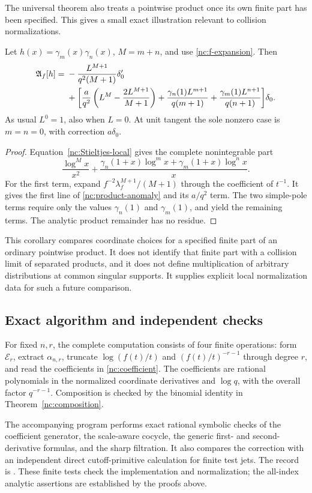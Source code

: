 The universal theorem also treats a pointwise product once its own
finite part has been specified. This gives a small exact illustration
relevant to collision normalizations.

\begin{corollary}
\label{nc:coincident}
Let $h(x)=\gamma_m(x)\gamma_n(x)$, $M=m+n$, and use
\eqref{nc:f-expansion}. Then
\begin{align}\label{nc:product-anomaly}
 \mathfrak A_f[h]={}&-\frac{L^{M+1}}{q^2(M+1)}\delta_0'\notag\\
 &+\biggl[
  \frac{a}{q^2}\left(L^M-\frac{2L^{M+1}}{M+1}\right)
  +\frac{\gamma_n(1)L^{m+1}}{q(m+1)}
  +\frac{\gamma_m(1)L^{n+1}}{q(n+1)}
                  \biggr]\delta_0.
\end{align}
As usual $L^0=1$, also when $L=0$. At unit tangent the sole nonzero
case is $m=n=0$, with correction $a\delta_0$.
\end{corollary}
\begin{proof}
Equation~\eqref{nc:Stieltjes-local} gives the complete nonintegrable
part
\[
 \frac{\log^{M}x}{x^2}
 +\frac{\gamma_n(1+x)\log^m x+
         \gamma_m(1+x)\log^n x}{x}.
\]
For the first term, expand $f^{-2}\lambda_f^{M+1}/(M+1)$ through
the coefficient of $t^{-1}$. It gives the first line of
\eqref{nc:product-anomaly} and its $a/q^2$ term. The two simple-pole
terms require only the values $\gamma_n(1)$ and $\gamma_m(1)$,
and yield the remaining terms. The analytic product remainder has no
residue.
\end{proof}

This corollary compares coordinate choices for a specified finite part
of an ordinary pointwise product. It does not identify that finite
part with a collision limit of separated products, and it does not
define multiplication of arbitrary distributions at common singular
supports. It supplies explicit local normalization data for such a
future comparison.

\subsection{Exact algorithm and independent checks}

For fixed $n,r$, the complete computation consists of four finite
operations: form $\mathcal E_r$, extract $\alpha_{n,r}$, truncate
$\log(f(t)/t)$ and $(f(t)/t)^{-r-1}$ through degree $r$, and read the
coefficients in \eqref{nc:coefficient}. The coefficients are rational
polynomials in the normalized coordinate derivatives and $\log q$,
with the overall factor $q^{-r-1}$. Composition is checked by the
binomial identity in Theorem~\ref{nc:composition}.

The accompanying program  performs exact
rational symbolic checks of the coefficient generator, the scale-aware
cocycle, the generic first- and second-derivative formulas, and the sharp
filtration. It also compares the correction with an independent direct
cutoff-primitive calculation for finite test jets. The record is
. These finite tests check the
implementation and normalization; the all-index analytic assertions
are established by the proofs above.
